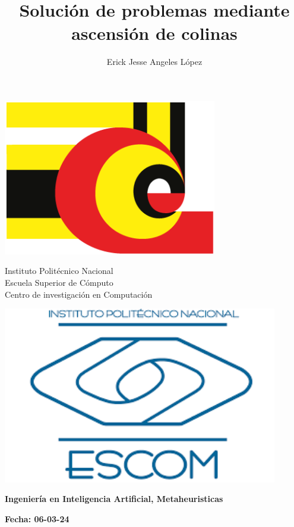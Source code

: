 \documentclass[12pt,twoside]{article}
\title{Solución de problemas mediante ascensión de colinas}
\author{Erick Jesse Angeles López}
\date{}
\begin{document}
	
	\begin{center}
		
		\begin{minipage}{0.17\textwidth}
			\centering
			\includegraphics[width=0.7\textwidth]{img/cic_logo.png} %
		\end{minipage}
		\begin{minipage}{.55\textwidth}
			\centering
			{\Large Instituto Politécnico Nacional}\\
			{\Large Escuela Superior de Cómputo}\\
			{\Large Centro de investigación en Computación}
		\end{minipage}
		\begin{minipage}{0.17\textwidth}
			\centering
			\includegraphics[width=0.9\textwidth]{img/escom_logo} %
		\end{minipage}			
	\end{center}
	
	
	\centerline{\bf Ingeniería en Inteligencia Artificial, Metaheuristicas}
	
	\centerline{\bf Fecha: 06-03-24}
	
\end{document}
